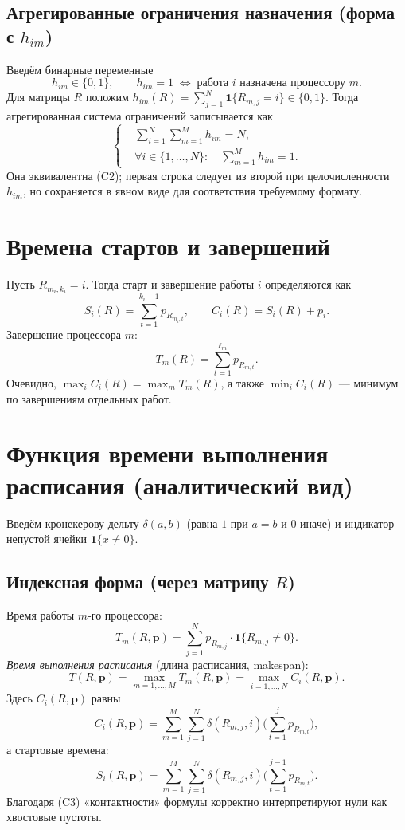 \documentclass[a4paper,12pt]{article}
\newcommand{\1}{\mathbf{1}} %
\begin{document}
\subsection*{Агрегированные ограничения назначения (форма с $h_{im}$)}
Введём бинарные переменные
\[
  h_{im}\in\{0,1\},\qquad h_{im}=1 \;\Longleftrightarrow\; \text{работа $i$ назначена процессору $m$}.
\]
Для матрицы $R$ положим $h_{im}(R)=\sum_{j=1}^{N}\1\{R_{m,j}=i\}\in\{0,1\}$. Тогда агрегированная система ограничений записывается как
\[
\boxed{
\left\{
\begin{aligned}
&\sum_{i=1}^{N}\sum_{m=1}^{M} h_{im}=N,\\[0.25em]
&\forall i\in\{1,\dots,N\}:\quad \sum_{m=1}^{M} h_{im}=1.
\end{aligned}
\right.
}
\tag{$\mathcal H$}
\]
Она эквивалентна (C2); первая строка следует из второй при целочисленности $h_{im}$, но сохраняется в явном виде для соответствия требуемому формату.

\section{Времена стартов и завершений}
Пусть $R_{m_i,k_i}=i$. Тогда старт и завершение работы $i$ определяются как
\[
  S_i(R)=\sum_{t=1}^{k_i-1} p_{R_{m_i,t}},\qquad
  C_i(R)=S_i(R)+p_i.
\]
Завершение процессора $m$:
\[
  T_m(R)=\sum_{t=1}^{\ell_m} p_{R_{m,t}}.
\]
Очевидно, $\max_i C_i(R)=\max_m T_m(R)$, а также $\min_i C_i(R)$ — минимум по завершениям отдельных работ.

\section{Функция времени выполнения расписания (аналитический вид)}
Введём кронекерову дельту $\delta(a,b)$ (равна $1$ при $a=b$ и $0$ иначе) и индикатор непустой ячейки $\1\{x\neq 0\}$.

\subsection*{Индексная форма (через матрицу $R$)}
Время работы $m$-го процессора:
\[
  T_m(R,\mathbf{p})
  =
  \sum_{j=1}^{N} p_{R_{m,j}}\cdot \1\{R_{m,j}\neq 0\}.
\]
\emph{Время выполнения расписания} (длина расписания, makespan):
\[
  T(R,\mathbf{p}) = \max_{m=1,\dots,M} T_m(R,\mathbf{p})
  = \max_{i=1,\dots,N} C_i(R,\mathbf{p}).
\]
Здесь $C_i(R,\mathbf{p})$ равны
\[
  C_i(R,\mathbf{p})
  =
  \sum_{m=1}^{M}\sum_{j=1}^{N}
  \delta(R_{m,j},i)\Biggl(\sum_{t=1}^{j} p_{R_{m,t}}\Biggr),
\]
а стартовые времена:
\[
  S_i(R,\mathbf{p})
  =
  \sum_{m=1}^{M}\sum_{j=1}^{N}
  \delta(R_{m,j},i)\Biggl(\sum_{t=1}^{j-1} p_{R_{m,t}}\Biggr).
\]
Благодаря (C3) «контактности» формулы корректно интерпретируют нули как хвостовые пустоты.
\end{document}
